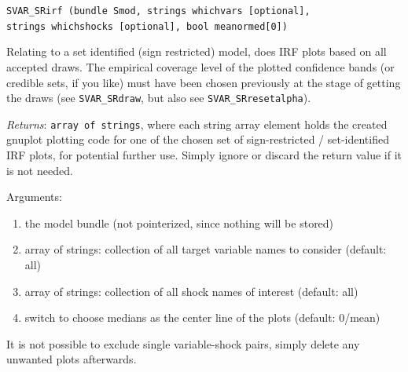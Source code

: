\documentclass[a4paper,10pt]{article}
\newenvironment{funcdoc}[1]
{\noindent\hrulefill\newline\nopagebreak\texttt{#1}%
\nopagebreak\par\noindent\hrulefill%
\nopagebreak\par\nopagebreak\smallskip\nopagebreak\par}
{\bigskip}
\begin{document}
\begin{funcdoc}{SVAR\_SRirf (bundle Smod, strings whichvars [optional], \\
      strings whichshocks [optional], bool meanormed[0])}
\noindent Relating to a set identified (sign restricted) model, does IRF plots
 based on all accepted draws. The empirical coverage level of the plotted
 confidence bands (or credible sets, if you like) must have been chosen
 previously at the stage of getting the draws (see 
 \texttt{SVAR\_SRdraw}, but also see \texttt{SVAR\_SRresetalpha}).%

\emph{Returns}: \texttt{array of strings}, where each string array element holds the created
 gnuplot plotting code for one of the chosen set of sign-restricted / set-identified IRF plots,
 for potential further use. Simply ignore or discard the return value if it is not needed.

\noindent Arguments:

\begin{enumerate}
  \item the model bundle (not pointerized, since nothing will be stored)
  \item array of strings: collection of all target variable names to consider (default: all)
  \item array of strings: collection of all shock names of interest (default: all)
  \item switch to choose medians as the center line of the plots (default: 0/mean)
 \end{enumerate}
 It is not possible to exclude single variable-shock pairs, simply delete any unwanted plots afterwards. 
\end{funcdoc}
\end{document}
